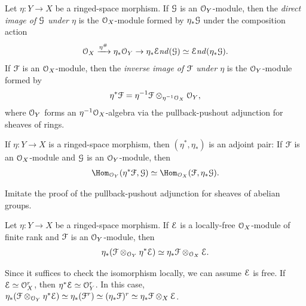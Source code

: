 \documentclass[10pt,final,oneside]{amsbook}
\makeatletter
\renewenvironment{proof}[1][\proofname] 
{ 	
	\par\pushQED{\qed}\normalfont\topsep6\p@\@plus6\p@\relax\trivlist\itemindent\normalparindent
	\item[\hskip\labelsep\itshape#1\@addpunct{.}]\ignorespaces
}
{
	\popQED\endtrivlist\@endpefalse
}
\numberwithin{equation}{section}
\newcommand{\SEnd}{{\mathcal{E}\mathit{nd}}}
\makeatother
\begin{document}
Let $\eta : Y \to X$ be a ringed-space morphism.
If $\cal{G}$ is an $\cal{O}_Y$-module, then the \emph{direct image of $\cal{G}$ under $\eta$} is the $\cal{O}_X$-module formed by $\eta_\ast \cal{G}$ under the composition action 
\begin{align}
\cal{O}_X \xrightarrow{\eta^\#} \eta_\ast \cal{O}_Y \to \eta_\ast \SEnd(\cal{G}) \simeq \SEnd(\eta_\ast \cal{G}).
\end{align}
If $\cal{F}$ is an $\cal{O}_X$-module, then the \emph{inverse image of $\cal{F}$ under $\eta$} is the $\cal{O}_Y$-module formed by 
\begin{align}
\eta^\ast \cal{F} = \eta^{-1}\cal{F} \otimes_{\eta^{-1}\cal{O}_X} \cal{O}_Y,
\end{align}
where $\cal{O}_Y$ forms an $\eta^{-1}\cal{O}_X$-algebra via the pullback-pushout adjunction for sheaves of rings.

\begin{prop}
If $\eta : Y \to X$ is a ringed-space morphism, then $(\eta^\ast, \eta_\ast)$ is an adjoint pair:
If $\cal{F}$ is an $\cal{O}_X$-module and $\cal{G}$ is an $\cal{O}_Y$-module, then
\begin{align}
\Hom_{\cal{O}_Y}(\eta^\ast \cal{F}, \cal{G}) 
\simeq	
\Hom_{\cal{O}_X}(\cal{F}, \eta_\ast\cal{G}).
\end{align}
\end{prop}

\begin{proof}
Imitate the proof of the pullback-pushout adjunction for sheaves of abelian groups.
\end{proof}

\begin{prop}
Let $\eta : Y \to X$ be a ringed-space morphism.
If $\cal{E}$ is a locally-free $\cal{O}_X$-module of finite rank and $\cal{F}$ is an $\cal{O}_Y$-module, then
\begin{align}
\eta_\ast(\cal{F} \otimes_{\cal{O}_Y} \eta^\ast \cal{E})
\simeq		
\eta_\ast \cal{F} \otimes_{\cal{O}_X} \cal{E}.
\end{align}
\end{prop}

\begin{proof}
Since it suffices to check the isomorphism locally, we can assume $\cal{E}$ is free.
If $\cal{E} \simeq \cal{O}_X^r$, then $\eta^\ast \cal{E} \simeq \cal{O}_Y^r$.
In this case, $\eta_\ast(\cal{F} \otimes_{\cal{O}_Y} \eta^\ast \cal{E}) \simeq \eta_\ast (\cal{F}^r) \simeq (\eta_\ast \cal{F})^r \simeq \eta_\ast \cal{F} \otimes_X \cal{E}$.
\end{proof}
\end{document}
